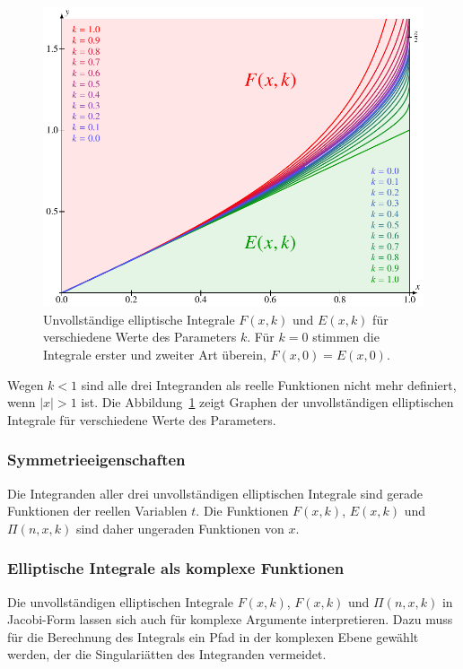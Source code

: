 \begin{figure}
\centering
\includegraphics{chapters/110-elliptisch/images/unvollstaendig.pdf}
\caption{Unvollständige elliptische Integrale $F(x,k)$ und $E(x,k)$
für verschiedene Werte des Parameters $k$.
Für $k=0$ stimmen die Integrale erster und zweiter Art überein,
$F(x,0)=E(x,0)$.
\label{buch:elliptisch:fig:unvollstaendigeintegrale}}
\end{figure}
Wegen $k<1$ sind alle drei Integranden als reelle Funktionen nicht
mehr definiert, wenn $|x|>1$ ist.
Die Abbildung~\ref{buch:elliptisch:fig:unvollstaendigeintegrale}
zeigt Graphen der unvollständigen elliptischen Integrale für verschiedene
Werte des Parameters.

%
%
\subsubsection{Symmetrieeigenschaften}
Die Integranden aller drei unvollständigen elliptischen Integrale
sind gerade Funktionen der reellen Variablen $t$.
Die Funktionen $F(x,k)$, $E(x,k)$ und $\Pi(n,x,k)$ sind daher
ungeraden Funktionen von $x$.

%
%
\subsubsection{Elliptische Integrale als komplexe Funktionen}
Die unvollständigen elliptischen Integrale $F(x,k)$, $F(x,k)$ und $\Pi(n,x,k)$
in Jacobi-Form lassen sich auch für komplexe Argumente interpretieren.
Dazu muss für die Berechnung des Integrals ein Pfad in der komplexen
Ebene gewählt werden, der die Singulariätten des Integranden vermeidet.

